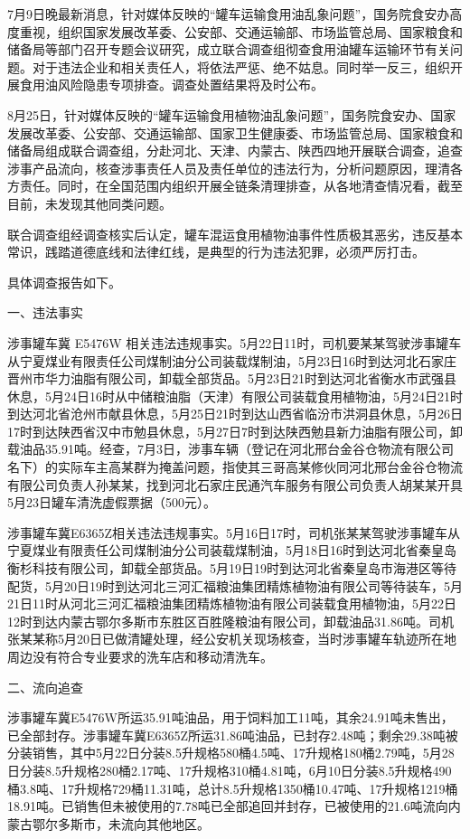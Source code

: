 7月9日晚最新消息，针对媒体反映的“罐车运输食用油乱象问题”，国务院食安办高度重视，组织国家发展改革委、公安部、交通运输部、市场监管总局、国家粮食和储备局等部门召开专题会议研究，成立联合调查组彻查食用油罐车运输环节有关问题。对于违法企业和相关责任人，将依法严惩、绝不姑息。同时举一反三，组织开展食用油风险隐患专项排查。调查处置结果将及时公布。

8月25日，针对媒体反映的“罐车运输食用植物油乱象问题”，国务院食安办、国家发展改革委、公安部、交通运输部、国家卫生健康委、市场监管总局、国家粮食和储备局组成联合调查组，分赴河北、天津、内蒙古、陕西四地开展联合调查，追查涉事产品流向，核查涉事责任人员及责任单位的违法行为，分析问题原因，理清各方责任。同时，在全国范围内组织开展全链条清理排查，从各地清查情况看，截至目前，未发现其他同类问题。

联合调查组经调查核实后认定，罐车混运食用植物油事件性质极其恶劣，违反基本常识，践踏道德底线和法律红线，是典型的行为违法犯罪，必须严厉打击。

具体调查报告如下。

一、违法事实

涉事罐车冀 E5476W 相关违法违规事实。5月22日11时，司机要某某驾驶涉事罐车从宁夏煤业有限责任公司煤制油分公司装载煤制油，5月23日16时到达河北石家庄晋州市华力油脂有限公司，卸载全部货品。5月23日21时到达河北省衡水市武强县休息，5月24日16时从中储粮油脂（天津）有限公司装载食用植物油，5月24日21时到达河北省沧州市献县休息，5月25日21时到达山西省临汾市洪洞县休息，5月26日17时到达陕西省汉中市勉县休息，5月27日7时到达陕西勉县新力油脂有限公司，卸载油品35.91吨。经查，7月3日，涉事车辆（登记在河北邢台金谷仓物流有限公司名下）的实际车主高某群为掩盖问题，指使其三哥高某修伙同河北邢台金谷仓物流有限公司负责人孙某某，找到河北石家庄民通汽车服务有限公司负责人胡某某开具5月23日罐车清洗虚假票据（500元）。

涉事罐车冀E6365Z相关违法违规事实。5月16日17时，司机张某某驾驶涉事罐车从宁夏煤业有限责任公司煤制油分公司装载煤制油，5月18日16时到达河北省秦皇岛衡杉科技有限公司，卸载全部货品。5月19日19时到达河北省秦皇岛市海港区等待配货，5月20日19时到达河北三河汇福粮油集团精炼植物油有限公司等待装车，5月21日11时从河北三河汇福粮油集团精炼植物油有限公司装载食用植物油，5月22日12时到达内蒙古鄂尔多斯市东胜区百胜隆粮油有限公司，卸载油品31.86吨。司机张某某称5月20日已做清罐处理，经公安机关现场核查，当时涉事罐车轨迹所在地周边没有符合专业要求的洗车店和移动清洗车。

二、流向追查

涉事罐车冀E5476W所运35.91吨油品，用于饲料加工11吨，其余24.91吨未售出，已全部封存。涉事罐车冀E6365Z所运31.86吨油品，已封存2.48吨；剩余29.38吨被分装销售，其中5月22日分装8.5升规格580桶4.5吨、17升规格180桶2.79吨，5月28日分装8.5升规格280桶2.17吨、17升规格310桶4.81吨，6月10日分装8.5升规格490桶3.8吨、17升规格729桶11.31吨，总计8.5升规格1350桶10.47吨、17升规格1219桶18.91吨。已销售但未被使用的7.78吨已全部追回并封存，已被使用的21.6吨流向内蒙古鄂尔多斯市，未流向其他地区。

